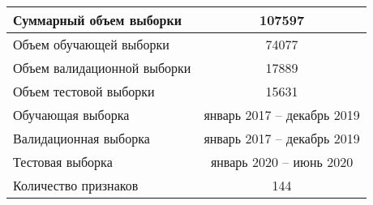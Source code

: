 \begin{tabular}{|l|c|}
		\hline
		
		Суммарный объем выборки           & 107597                  \\\hline
		
		Объем обучающей выборки   & 74077                    \\\hline
		
		Объем валидационной выборки    & 17889                                 \\\hline
		
		Объем тестовой выборки    & 15631      \\ \hline
		
		Обучающая выборка                     & январь 2017 -- декабрь 2019     \\\hline
		
		Валидационная выборка                     & январь 2017 -- декабрь 2019     \\\hline
		
		Тестовая выборка                          & январь 2020 -- июнь 2020   \\\hline
		
		Количество признаков                  & 144                         \\\hline
		
	\end{tabular}